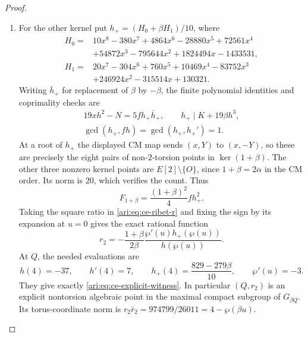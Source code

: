 \begin{proof}
\begin{enumerate}[label=\arabic*.,leftmargin=*]
\item For the other kernel put $h_+=(H_0+\beta H_1)/10$, where
\[
 \begin{aligned}
 H_0={}&10x^8-380x^7+4864x^6-28880x^5+72561x^4\\
       &+54872x^3-795644x^2+1824494x-1433531,\\
 H_1={}&20x^7-304x^6+760x^5+10469x^4-83752x^3\\
       &+246924x^2-315514x+130321.
 \end{aligned}
\]
Writing $\bar h_+$ for replacement of $\beta$ by $-\beta$,
the finite polynomial identities and coprimality checks are
\[
 \begin{gathered}
 19xh^2-N=5f h_+\bar h_+,\qquad
 h_+\mid K+19\beta h^3,\\
 \gcd(h_+,fh)=\gcd(h_+,h_+')=1.
 \end{gathered}
\]
At a root of $h_+$ the displayed CM map sends $(x,Y)$ to
$(x,-Y)$, so these are precisely the eight pairs of
non-$2$-torsion points in $\ker(1+\beta)$. The other three
nonzero kernel points are $E[2]\setminus\{O\}$, since
$1+\beta=2\alpha$ in the CM order. Its norm is $20$,
which verifies the count. Thus
\[
 F_{1+\beta}=\frac{(1+\beta)^2}{4}f h_+^2.
\]
Taking the square ratio in \eqref{ari:eq:ce-ribet-r} and fixing
the sign by its expansion at $u=0$ gives the exact rational
function
\[
 r_2=-\frac{1+\beta}{2\beta}\frac{\wp'(u)h_+(\wp(u))}
                                             {h(\wp(u))}.
\]
At $Q$, the needed evaluations are
\[
 h(4)=-37,\qquad h'(4)=7,\qquad
 h_+(4)=\frac{829-279\beta}{10},\qquad\wp'(u)=-3.
\]
They give exactly \eqref{ari:eq:ce-explicit-witness}. In
particular $(Q,r_2)$ is an explicit nontorsion algebraic
point in the maximal compact subgroup of $G_{\beta Q}$.
Its torus-coordinate norm is
$r_2\bar r_2=974799/26011=4-\wp(\beta u)$.


\end{enumerate}
\end{proof}
